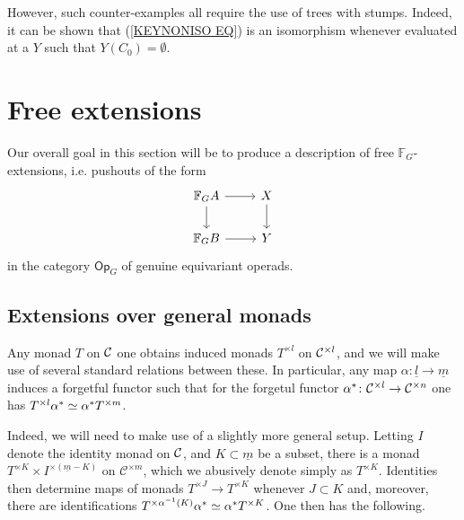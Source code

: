 \documentclass[a4paper,10pt]{article}%
\begin{document}
\begin{remark}
However, such counter-examples all require the use of trees with stumps. Indeed, it can be shown that (\ref{KEYNONISO EQ})
is an isomorphism whenever evaluated at a $Y$ such that $Y(C_0)=\emptyset$.
\end{remark}



\section{Free extensions}
\label{FREE_EXTENSIONS_SECTION}

Our overall goal in this section will be to produce a description of free $\mathbb F_G$-extensions,  %
i.e. pushouts of the form
\begin{equation}
  \label{FREE_FG_EXT_EQ}
  \begin{tikzcd}
    \mathbb{F}_G A \ar{r} \ar{d} & X \ar{d}
    \\
    \mathbb{F}_G B \ar{r} & Y
  \end{tikzcd}
\end{equation}
in the category $\mathsf{Op}_G$ of genuine equivariant operads.



\subsection{Extensions over general monads}\label{EXTGENMON SEC}

Any monad $T$ on $\mathcal{C}$ one obtains induced monads $T^{\times l}$ on $\mathcal{C}^{\times l}$, and we will make use of several standard relations between these.
In particular, any map $\alpha \colon \underline{l} \to \underline{m}$ induces a forgetful functor
such that for the forgetul functor 
$\alpha^{\**} \colon \C^{\times l} \to \C^{\times n}$
one has $T^{\times l} \alpha^{\**} \simeq  \alpha^{\**} T^{\times m}$.


Indeed, we will need to make use of a slightly more general setup. Letting $I$ denote the identity monad on $\mathcal{C}$, and $K \subset \underline{m}$ be a subset, there is a monad $T^{\times K} \times I^{\times(\underline{m}-K)}$ on $\mathcal{C}^{\times m}$, which we abusively denote simply as $T^{\times K}$. Identities then determine maps of monads 
$T^{\times J} \to T^{\times K}$ whenever $J \subset K$
and, moreover, there are identifications
$T^{\times \alpha^{-1}(K)} \alpha^{\**} \simeq \alpha^{\**} T^{\times K}$.
One then has the following.
\end{document}
